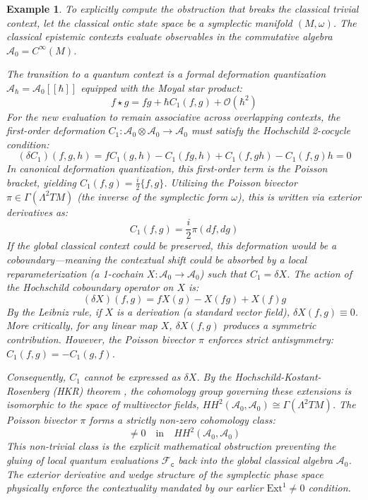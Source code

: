 \documentclass{article}
\newtheorem{eg}{Example}
\numberwithin{tm}{section}
\numberwithin{dn}{section}
\numberwithin{as}{section}
\numberwithin{rk}{section}
\numberwithin{lem}{section}
\numberwithin{ax}{section}
\numberwithin{pp}{section}
\numberwithin{eg}{section}
\numberwithin{war}{section}
\numberwithin{equation}{section}
\numberwithin{prop}{section}
\numberwithin{nt}{section}
\numberwithin{rc}{section}
\def\code#1{\texttt{#1}}
\begin{document}
\begin{eg}
	To explicitly compute the obstruction that breaks the classical trivial context, let the classical ontic state space be a symplectic manifold $(M, \omega)$. The classical epistemic contexts evaluate observables in the commutative algebra $\mathcal{A}_0 = C^\infty(M)$. 
	
	The transition to a quantum context is a formal deformation quantization $\mathcal{A}_\hbar = \mathcal{A}_0[[\hbar]]$ equipped with the Moyal star product:
	\begin{equation}
		f \star g = fg + \hbar C_1(f, g) + \mathcal{O}(\hbar^2)
	\end{equation}
	For the new evaluation to remain associative across overlapping contexts, the first-order deformation $C_1: \mathcal{A}_0 \otimes \mathcal{A}_0 \to \mathcal{A}_0$ must satisfy the Hochschild 2-cocycle condition:
	\begin{equation} \label{eq:cocycle}
		(\delta C_1)(f, g, h) = f C_1(g, h) - C_1(fg, h) + C_1(f, gh) - C_1(f, g)h = 0
	\end{equation}
	In canonical deformation quantization, this first-order term is the Poisson bracket, yielding $C_1(f, g) = \frac{i}{2} \{f, g\}$. Utilizing the Poisson bivector $\pi \in \Gamma(\Lambda^2 TM)$ (the inverse of the symplectic form $\omega$), this is written via exterior derivatives as:
	\begin{equation}
		C_1(f, g) = \frac{i}{2} \pi(df, dg)
	\end{equation}
	If the global classical context could be preserved, this deformation would be a \emph{coboundary}---meaning the contextual shift could be absorbed by a local reparameterization (a 1-cochain $X: \mathcal{A}_0 \to \mathcal{A}_0$) such that $C_1 = \delta X$. The action of the Hochschild coboundary operator on $X$ is:
	\begin{equation}
		(\delta X)(f, g) = f X(g) - X(fg) + X(f)g
	\end{equation}
	By the Leibniz rule, if $X$ is a derivation (a standard vector field), $\delta X(f, g) \equiv 0$. More critically, for any linear map $X$, $\delta X(f, g)$ produces a symmetric contribution. However, the Poisson bivector $\pi$ enforces strict antisymmetry: $C_1(f, g) = -C_1(g, f)$. 
	
	Consequently, $C_1$ cannot be expressed as $\delta X$. By the Hochschild-Kostant-Rosenberg (HKR) theorem \cite{Kelly}, the cohomology group governing these extensions is isomorphic to the space of multivector fields, $HH^2(\mathcal{A}_0, \mathcal{A}_0) \cong \Gamma(\Lambda^2 TM)$. The Poisson bivector $\pi$ forms a strictly non-zero cohomology class:
	\begin{equation}
		[\pi] \neq 0 \quad \text{in} \quad HH^2(\mathcal{A}_0, \mathcal{A}_0)
	\end{equation}
	This non-trivial class is the explicit mathematical obstruction preventing the gluing of local quantum evaluations $\mathcal{F}_\code{c}$ back into the global classical algebra $\mathcal{A}_0$. The exterior derivative and wedge structure of the symplectic phase space physically enforce the contextuality mandated by our earlier $\text{Ext}^1 \neq 0$ condition.
\end{eg}
\end{document}
